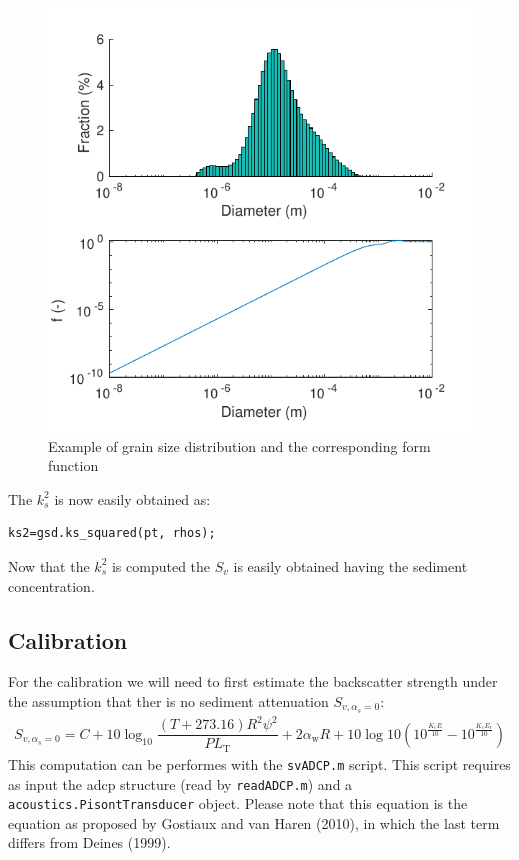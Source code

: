 \documentclass[]{artikel3}
\begin{document}
\begin{figure}[h]
  \centering
  \includegraphics{gsd.pdf}
  \caption{Example of grain size distribution and the corresponding form function}
  \label{fig:gsd}
\end{figure}
The $k_s^2$ is now easily obtained as:
\begin{lstlisting}
ks2=gsd.ks_squared(pt, rhos);
\end{lstlisting}
Now that the $k_s^2$ is computed the $S_v$ is easily obtained having the sediment concentration.

\subsection{Calibration}
For the calibration we will need to first estimate the backscatter strength under the assumption that ther is no sediment attenuation $S_{v,\alpha_s=0}$:
\begin{align}
  S_{v,\alpha_s=0}= C + 10\log_{10}\dfrac{(T+273.16)R^2 \psi^2}{PL_\text{T}}  + 2\alpha_\text{w}R + 10\log10\left(10^{\frac{K_\text{c}E}{10}}-10^{\frac{K_\text{c}E_\text{r}}{10}}\right)
\end{align}
This computation can be performes with the \texttt{svADCP.m} script. This script requires as input the adcp structure (read by \texttt{readADCP.m}) and a \texttt{acoustics.PisontTransducer} object. Please note that this equation is the equation as proposed by Gostiaux and van Haren (2010), in which the last term differs from Deines (1999).
\end{document}
